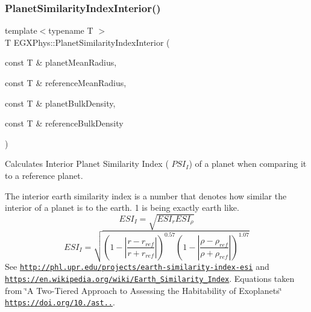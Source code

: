 \subsubsection{\texorpdfstring{Planet\+Similarity\+Index\+Interior()}{PlanetSimilarityIndexInterior()}}
{\footnotesize\ttfamily template$<$typename T $>$ \\
T E\+G\+X\+Phys\+::\+Planet\+Similarity\+Index\+Interior (\begin{DoxyParamCaption}\item[{const T \&}]{planet\+Mean\+Radius,  }\item[{const T \&}]{reference\+Mean\+Radius,  }\item[{const T \&}]{planet\+Bulk\+Density,  }\item[{const T \&}]{reference\+Bulk\+Density }\end{DoxyParamCaption})}



Calculates Interior Planet Similarity Index ( $PSI_I$) of a planet when comparing it to a reference planet. 

The interior earth similarity index is a number that denotes how similar the interior of a planet is to the earth. 1 is being exactly earth like. \[ESI_I=\sqrt{ESI_r ESI_\rho}\] \[ESI_I=\sqrt{\left ( 1 - \left | \frac{r-r_{ref}}{r+r_{ref}} \right | \right )^{0.57} \left ( 1 - \left | \frac{\rho-\rho_{ref}}{\rho+\rho_{ref}} \right | \right )^{1.07}}\] See \href{http://phl.upr.edu/projects/earth-similarity-index-esi}{\tt http\+://phl.\+upr.\+edu/projects/earth-\/similarity-\/index-\/esi} and \href{https://en.wikipedia.org/wiki/Earth_Similarity_Index}{\tt https\+://en.\+wikipedia.\+org/wiki/\+Earth\+\_\+\+Similarity\+\_\+\+Index}. Equations taken from \char`\"{}\+A Two-\/\+Tiered Approach to Assessing the Habitability of Exoplanets\char`\"{} \href{https://doi.org/10.1089/ast.2010.0592}{\tt https\+://doi.\+org/10./ast..}.


